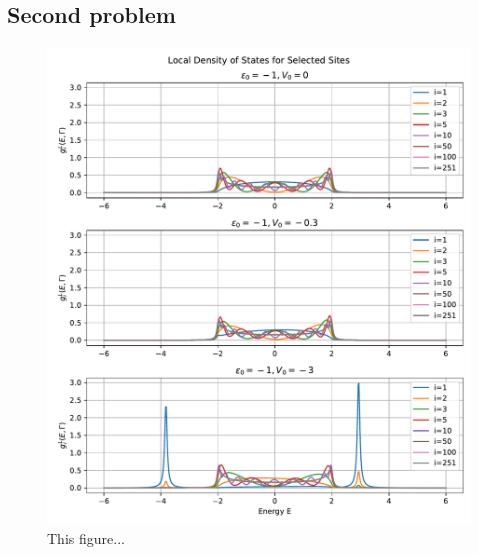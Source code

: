 \subsection{Second problem}

\begin{figure}[H]
    \centering    \includegraphics[width=\textwidth]{Figures/task2.pdf}
    \caption{This figure...}
    \label{fig:task2}
\end{figure}